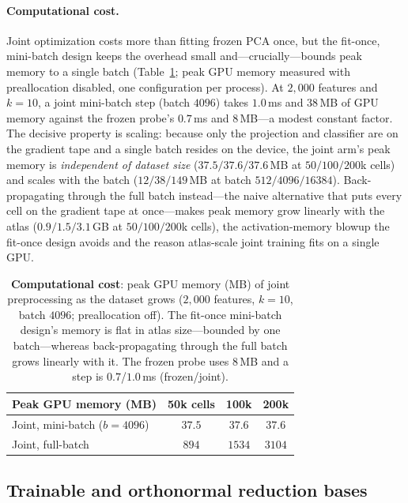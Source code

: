 \documentclass[10pt,twocolumn]{article}
\begin{document}
\paragraph{Computational cost.} Joint optimization costs more than fitting frozen PCA once, but
the fit-once, mini-batch design keeps the overhead small and---crucially---bounds peak memory to
a single batch (Table~\ref{tab:compute}; peak GPU memory measured with preallocation disabled,
one configuration per process). At $2{,}000$ features and $k{=}10$, a joint mini-batch step
(batch $4096$) takes $1.0$\,ms and $38$\,MB of GPU memory against the frozen probe's $0.7$\,ms
and $8$\,MB---a modest constant factor. The decisive property is scaling: because only the
projection and classifier are on the gradient tape and a single batch resides on the device, the
joint arm's peak memory is \emph{independent of dataset size} ($37.5/37.6/37.6$\,MB at
$50/100/200$k cells) and scales with the batch ($12/38/149$\,MB at batch $512/4096/16384$).
Back-propagating through the full batch instead---the naive alternative that puts every cell on
the gradient tape at once---makes peak memory grow linearly with the atlas
($0.9/1.5/3.1$\,GB at $50/100/200$k cells), the activation-memory blowup the fit-once design
avoids and the reason atlas-scale joint training fits on a single GPU.

\begin{table}[t]
\centering\small
\caption{\textbf{Computational cost}: peak GPU memory (MB) of joint preprocessing as the dataset
grows ($2{,}000$ features, $k{=}10$, batch $4096$; preallocation off). The fit-once mini-batch
design's memory is flat in atlas size---bounded by one batch---whereas back-propagating through
the full batch grows linearly with it. The frozen probe uses $8$\,MB and a step is $0.7$/$1.0$\,ms
(frozen/joint).}
\label{tab:compute}
\begin{tabular}{@{}lccc@{}}
\toprule
Peak GPU memory (MB) & 50k cells & 100k & 200k \\
\midrule
Joint, mini-batch ($b{=}4096$) & $37.5$ & $37.6$ & $37.6$ \\
Joint, full-batch & $894$ & $1534$ & $3104$ \\
\bottomrule
\end{tabular}
\end{table}

\subsection{Trainable and orthonormal reduction bases}
\label{sec:trainablebasis}
\end{document}
